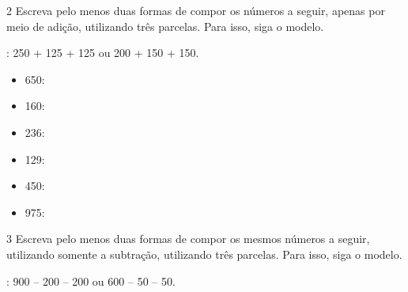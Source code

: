 \num{2} Escreva pelo menos duas formas de compor os números a seguir, apenas por meio de adição, utilizando três parcelas. Para isso, siga o modelo.


\begin{mdframed}[linewidth=2pt,linecolor=azul!20,backgroundcolor=azul!20,roundcorner=2pt]
: 250 + 125 + 125 ou 200 + 150 + 150.
\end{mdframed}

\begin{itemize}
\item 650: 

\item 160: 

\item 236: 

\item 129: 

\item 450: 

\item 975: 

\end{itemize}


\num{3} Escreva pelo menos duas formas de compor os mesmos números a seguir, 
utilizando somente a subtração, utilizando três parcelas. Para isso, siga o modelo.


\begin{mdframed}[linewidth=2pt,linecolor=azul!20,backgroundcolor=azul!20,roundcorner=2pt]
: 900 -- 200 -- 200 ou 600 -- 50 -- 50.
\end{mdframed}

